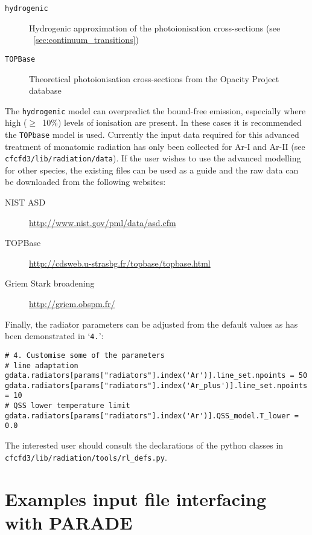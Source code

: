 \begin{description}
 \item[\texttt{hydrogenic}] Hydrogenic approximation of the photoionisation cross-sections (see \textsection~\ref{sec:continuum_transitions})
 \item[\texttt{TOPBase}] Theoretical photoionisation cross-sections from the Opacity Project database~\cite{TOPbase}
\end{description}

The \texttt{hydrogenic} model can overpredict the bound-free emission, especially where high ($\geq$~10\%) levels of ionisation are present.
In these cases it is recommended the \texttt{TOPbase} model is used.
Currently the input data required for this advanced treatment of monatomic radiation has only been collected for Ar-I and Ar-II (see \texttt{cfcfd3/lib/radiation/data}).
If the user wishes to use the advanced modelling for other species, the existing files can be used as a guide and the raw data can be downloaded from the following websites:

\begin{description}
 \item[NIST ASD] \url{http://www.nist.gov/pml/data/asd.cfm}
 \item[TOPBase] \url{http://cdsweb.u-strasbg.fr/topbase/topbase.html}
 \item[Griem Stark broadening] \url{http://griem.obspm.fr/}
\end{description}

\par

Finally, the radiator parameters can be adjusted from the default values as has been demonstrated in `\texttt{4.}':

\begin{lstlisting}[basicstyle=\ttfamily\small]
# 4. Customise some of the parameters
# line adaptation
gdata.radiators[params["radiators"].index('Ar')].line_set.npoints = 50
gdata.radiators[params["radiators"].index('Ar_plus')].line_set.npoints = 10
# QSS lower temperature limit
gdata.radiators[params["radiators"].index('Ar')].QSS_model.T_lower = 0.0
\end{lstlisting}

\noindent The interested user should consult the declarations of the python classes in \\ \noindent \texttt{cfcfd3/lib/radiation/tools/rl\_defs.py}.

\section{Examples input file interfacing with PARADE}
\label{sec:parade_input}

